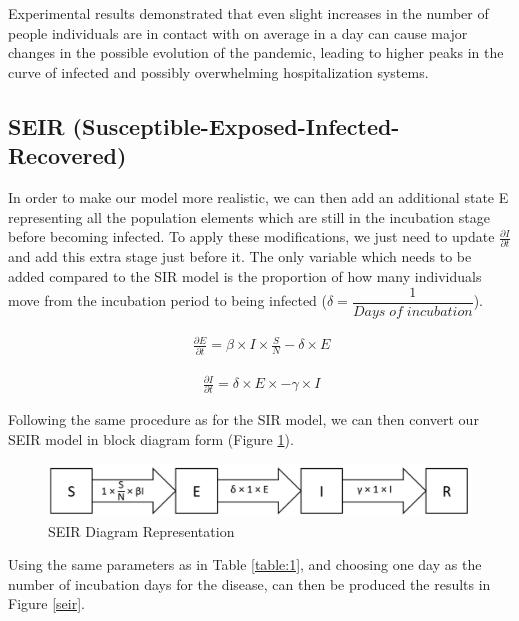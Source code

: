 Experimental results demonstrated that even slight increases in the number of people individuals are in contact with on average in a day can cause major changes in the possible evolution of the pandemic, leading to higher peaks in the curve of infected and possibly overwhelming hospitalization systems.

\subsection{SEIR (Susceptible-Exposed-Infected-Recovered)}

In order to make our model more realistic, we can then add an additional state E representing all the population elements which are still in the incubation stage before becoming infected. To apply these modifications, we just need to update $\frac{\partial I}{\partial t}$ and add this extra stage just before it. The only variable which needs to be added compared to the SIR model is the proportion of how many individuals move from the incubation period to being infected ($\delta = \dfrac{1}{Days\;of\;incubation}$).

\useshortskip
\begin{align}
\ \frac{\partial E}{\partial t} = \beta \times I \times \frac{S}{N} -\delta \times E
\end{align}
\useshortskip

\useshortskip
\begin{align}
\ \frac{\partial I}{\partial t} = \delta \times E \times -\gamma \times I
\end{align}
\useshortskip

Following the same procedure as for the SIR model, we can then convert our SEIR model in block diagram form (Figure \ref{dseir}).

\begin{figure}[ht!]%
    \centering
    \includegraphics[width=0.75\linewidth]{latex/images/dseir.pdf}
    \caption{SEIR Diagram Representation}
    \label{dseir}
\end{figure}

Using the same parameters as in Table \ref{table:1}, and choosing one day as the number of incubation days for the disease, can then be produced the results in Figure \ref{seir}.


